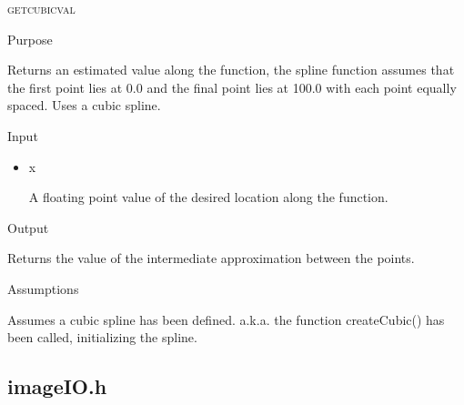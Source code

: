 \documentclass[pdftex, 11pt]{article}
\begin{document}
\begin{description}
\begin{description}
		\end{description}


	\item{\textsc{getcubicval}}
		\begin{description}
			\item{Purpose}

				Returns an estimated value along the function, the spline function assumes
				that the first point lies at 0.0 and the final point lies at 100.0 with each
				point equally spaced.  Uses a cubic spline.

			\item{Input}

				\begin{itemize}

					\item{x}

						A floating point value of the desired location along the function.

				\end{itemize}

			\item{Output}

				Returns the value of the intermediate approximation between the points.

			\item{Assumptions}

				Assumes a cubic spline has been defined. a.k.a. the function createCubic() has
				been called, initializing the spline.

		\end{description}


\end{description}

\subsection{imageIO.h}
\end{document}
